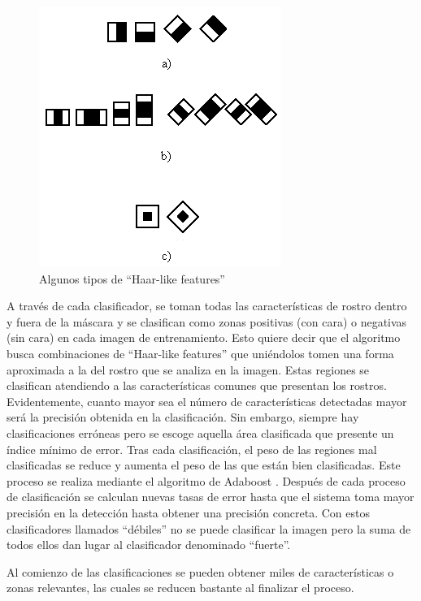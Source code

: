 \begin{figure}
\centering
\includegraphics[scale = 0.7]{capitulo_02/figuras_dir/mascaras.jpg}
\caption{Algunos tipos de ``Haar-like features''}
\end{figure}

A través de cada clasificador, se toman todas las características de rostro dentro y fuera de la máscara y se clasifican como zonas positivas (con cara) o negativas (sin cara) en cada imagen de entrenamiento. Esto quiere decir que el algoritmo busca combinaciones de ``Haar-like features'' \citep{opencvhaar} que uniéndolos tomen una forma aproximada a la del rostro que se analiza en la imagen. Estas regiones se clasifican atendiendo a las características comunes que presentan los rostros. Evidentemente, cuanto mayor sea el número de características detectadas mayor será la precisión obtenida en la clasificación. Sin embargo, siempre hay clasificaciones erróneas pero se escoge aquella área clasificada que presente un índice mínimo de error. Tras cada clasificación, el peso de las regiones mal clasificadas se reduce y aumenta el peso de las que están bien clasificadas. Este proceso se realiza mediante el algoritmo de Adaboost \citep{opencvorg}. Después de cada proceso de clasificación se calculan nuevas tasas de error hasta que el sistema toma mayor precisión en la detección hasta obtener una precisión concreta. Con estos clasificadores llamados ``débiles'' no se puede clasificar la imagen pero la suma de todos ellos dan lugar al clasificador denominado ``fuerte''. 

Al comienzo de las clasificaciones se pueden obtener miles de características o zonas relevantes, las cuales se reducen bastante al finalizar el proceso.


